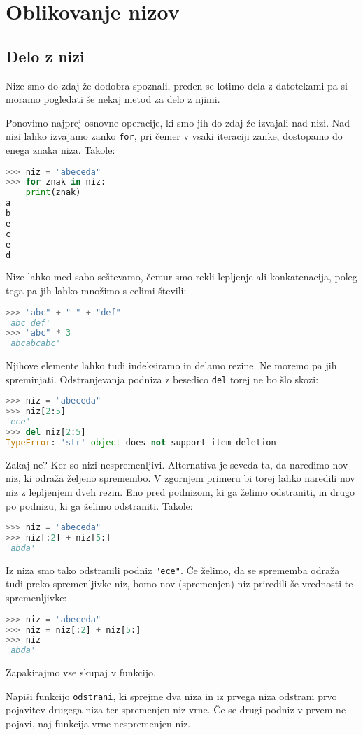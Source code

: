 \chapter{Oblikovanje nizov}

\section{Delo z nizi}

Nize smo do zdaj že dodobra spoznali, preden se lotimo dela z datotekami pa si moramo pogledati še nekaj metod za delo z njimi.

Ponovimo najprej osnovne operacije, ki smo jih do zdaj že izvajali nad nizi. Nad nizi lahko izvajamo zanko \texttt{for}, pri čemer v vsaki iteraciji zanke, dostopamo do enega znaka niza. Takole:
\begin{lstlisting}[language=Python]
>>> niz = "abeceda"
>>> for znak in niz:
	print(znak)
a
b
e
c
e
d
\end{lstlisting}
Nize lahko med sabo seštevamo, čemur smo rekli lepljenje ali konkatenacija, poleg tega pa jih lahko množimo s celimi števili:
\begin{lstlisting}[language=Python]
>>> "abc" + " " + "def"
'abc def'
>>> "abc" * 3
'abcabcabc'
\end{lstlisting}
Njihove elemente lahko tudi indeksiramo in delamo rezine. Ne moremo pa jih spreminjati. Odstranjevanja podniza z besedico \texttt{del} torej ne bo šlo skozi:
\begin{lstlisting}[language=Python]
>>> niz = "abeceda"
>>> niz[2:5]
'ece'
>>> del niz[2:5]
TypeError: 'str' object does not support item deletion
\end{lstlisting}
Zakaj ne? Ker so nizi nespremenljivi. Alternativa je seveda ta, da naredimo nov niz, ki odraža željeno spremembo. V zgornjem primeru bi torej lahko naredili nov niz z lepljenjem dveh rezin. Eno pred podnizom, ki ga želimo odstraniti, in drugo po podnizu, ki ga želimo odstraniti. Takole:
\begin{lstlisting}[language=Python]
>>> niz = "abeceda"
>>> niz[:2] + niz[5:]
'abda'
\end{lstlisting}
Iz niza smo tako odstranili podniz \texttt{"ece"}. Če želimo, da se sprememba odraža tudi preko spremenljivke niz, bomo nov (spremenjen) niz priredili še vrednosti te spremenljivke:
\begin{lstlisting}[language=Python]
>>> niz = "abeceda"
>>> niz = niz[:2] + niz[5:]
>>> niz
'abda'
\end{lstlisting}
Zapakirajmo vse skupaj v funkcijo.
\begin{zgled}
Napiši funkcijo \texttt{odstrani}, ki sprejme dva niza in iz prvega niza odstrani prvo pojavitev drugega niza ter spremenjen niz vrne. Če se drugi podniz v prvem ne pojavi, naj funkcija vrne nespremenjen niz.
\end{zgled}

